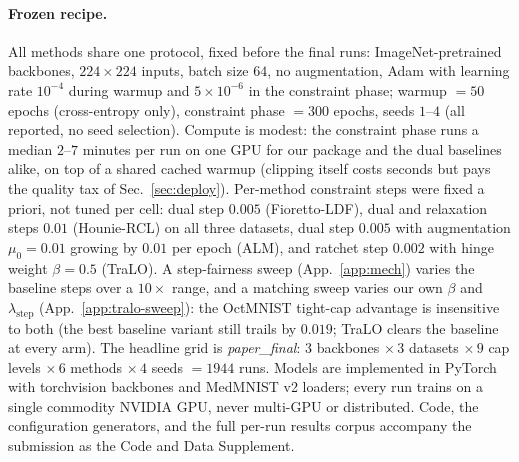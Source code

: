 \documentclass[10pt]{article}
\begin{document}
\paragraph{Frozen recipe.}
All methods share one protocol, fixed before the final runs:
ImageNet-pretrained backbones, $224{\times}224$ inputs, batch size $64$, no
augmentation, Adam with learning rate $10^{-4}$ during warmup and
$5{\times}10^{-6}$ in the constraint phase; warmup $=50$ epochs
(cross-entropy only), constraint phase $=300$ epochs, seeds $1$--$4$ (all
reported, no seed selection). Compute is modest: the constraint phase runs
a median $2$--$7$ minutes per run on one GPU for our package and the dual
baselines alike, on top of a shared cached warmup (clipping itself costs
seconds but pays the quality tax of Sec.~\ref{sec:deploy}). Per-method
constraint steps were fixed a priori, not tuned per cell: dual step $0.005$
(Fioretto-LDF), dual and relaxation steps $0.01$ (Hounie-RCL) on all three
datasets,{ dual step $0.005$ with augmentation $\mu_0{=}0.01$ growing
by $0.01$ per epoch (ALM),} and ratchet step $0.002$ with hinge weight
$\beta{=}0.5$ (TraLO).
A step-fairness sweep (App.~\ref{app:mech}) varies the baseline steps
over a $10\times$ range, and a matching sweep varies our own $\beta$ and
$\lambda_{\text{step}}$ (App.~\ref{app:tralo-sweep}): the OctMNIST
tight-cap advantage is insensitive to both (the best baseline variant still
trails by $0.019$; TraLO clears the baseline at every arm). The headline
grid is \emph{paper\_final}: $3$ backbones $\times\,3$ datasets $\times\,9$
cap levels $\times\,6$ methods $\times\,4$ seeds $=1944$ runs. Models are
implemented in PyTorch with torchvision backbones and MedMNIST v2 loaders{; every run trains on a single commodity
NVIDIA GPU, never multi-GPU or distributed}. Code, the configuration generators, and the full
per-run results corpus accompany the submission as the Code and Data
Supplement.
\end{document}
